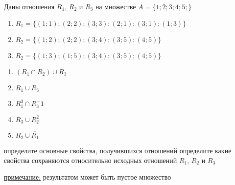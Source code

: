 \question
Даны отношения $R_1$, $R_2$ и $R_3$ на множестве $A = \{1; 2; 3; 4; 5;\}$ 
\begin{enumerate}
	\renewcommand{\labelenumi}{\alph{enumi})}
	\item $R_1 = \{(1; 1); (2; 2); (3; 3); (2; 1);  (3; 1); (1; 3)\}$
	\item $R_2 = \{(1; 2); (2; 2); (3; 4); (3; 5); (4; 5)\}$
	\item $R_2 = \{(1; 3); (1; 5); (3; 4); (3; 5); (4; 5)\}$
\end{enumerate}

\begin{enumerate}
	\renewcommand{\labelenumi}{\alph{enumi})}
	\item $(R_1 \cap R_2) \cup R_3$
	\item $R_1 \cup R_3$
	\item $R_1^3 \cap R_3^-1$
	\item $R_3 \cup R_2^2$
	\item $R_2 \cup \overline{R_1}$
\end{enumerate}

определите основные свойства, получившихся отношений
определите какие свойства сохраняются относительно исходных отношений $R_1$, $R_2$ и $R_3$ 

\underline{примечание:} результатом может быть пустое множество
